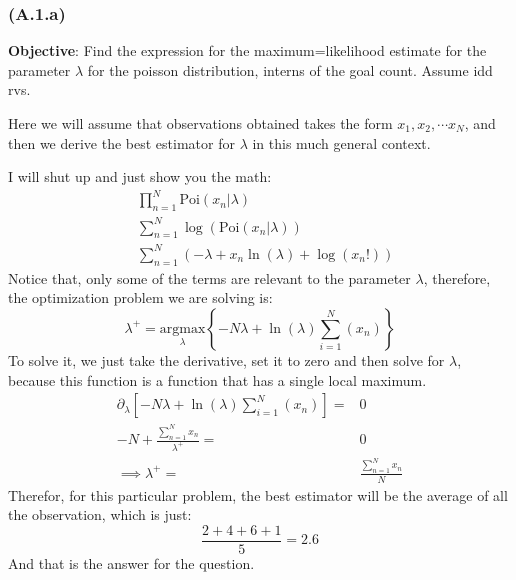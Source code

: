 \documentclass[]{article}
\begin{document}
        \subsubsection*{(A.1.a)}\label{A.1.a}
            \hspace{1.1em}
            \textbf{Objective}: Find the expression for the maximum=likelihood estimate for the parameter $\lambda$ for the poisson distribution, interns of the goal count. Assume idd rvs. 
            \par
            Here we will assume that observations obtained takes the form $x_1, x_2, \cdots x_N$, and then we derive the best estimator for $\lambda$ in this much general context. 
            \par
            I will shut up and just show you the math: 
            \begin{align*}\tag{A.1.a.1}\label{eqn:A.1.a.1}
                & 
                \prod_{n = 1}^{N} 
                \text{Poi}(x_n|\lambda)
                \\
                &
                \sum_{n = 1}^{N}
                \log\left(
                    \text{Poi}(x_n|\lambda)
                \right)
                \\
                &
                \sum_{n = 1}^{N}
                \left(
                    -\lambda + x_n\ln(\lambda) + \log(x_n!)
                \right)
            \end{align*}
            Notice that, only some of the terms are relevant to the parameter $\lambda$, therefore, the optimization problem we are solving is: 
            \begin{equation*}\tag{A.1.a.2}\label{eqn:A.1.a.2}
                \lambda^+ = 
                \underset{\lambda}{\text{argmax}}
                \left\lbrace
                    -N\lambda
                    +  
                    \ln(\lambda)
                    \sum_{i = 1}^{N}
                        \left(
                            x_n
                        \right)
                \right\rbrace
            \end{equation*}
            To solve it, we just take the derivative, set it to zero and then solve for $\lambda$, because this function is a function that has a single local maximum. 
            \begin{align*}\tag{A.1.a.3}\label{eqn:A.1.a.3}
                \partial_\lambda \left[
                -N\lambda
                +  
                \ln(\lambda)
                \sum_{i = 1}^{N}
                    \left(
                        x_n
                    \right)
                \right] =& 0
                \\
                -N + \frac{\sum_{n = 1}^{N}x_n}{
                \lambda^+
                } =& 0 
                \\
                \implies
                \lambda^+ =& \frac{\sum_{n = 1}^{N}x_n}{N}
            \end{align*}
            Therefor, for this particular problem, the best estimator will be the average of all the observation, which is just: 
            $$
                \frac{2 + 4 + 6 + 1}{5} = 2.6
            $$
            And that is the answer for the question. 
\end{document}
